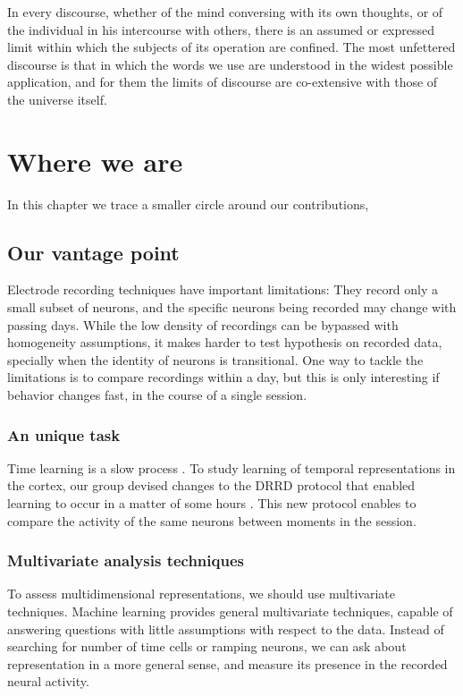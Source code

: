 \begin{savequote}[75mm]
In every discourse, whether of the mind conversing with its own thoughts, or of the individual in his intercourse with others, there is an assumed or expressed limit within which the subjects of its operation are confined. The most unfettered discourse is that in which the words we use are understood in the widest possible application, and for them the limits of discourse are co-extensive with those of the universe itself.
\end{savequote}

\chapter{Where we are}
\label{chap:where}

In this chapter we trace a smaller circle around our contributions, 


\section{Our vantage point}
Electrode recording techniques have important limitations: They record only a small subset of neurons, and the specific neurons being recorded may change with passing days. While the low density of recordings can be bypassed with homogeneity assumptions, it makes harder to test hypothesis on recorded data, specially when the identity of neurons is transitional. One way to tackle the limitations is to compare recordings within a day, but this is only interesting if behavior changes fast, in the course of a single session.
    \subsection{An unique task}
    Time learning is a slow process \cite{paton2018neural}. To study learning of temporal representations in the cortex, our group devised changes to the DRRD protocol that enabled learning to occur in a matter of some hours \cite{}. This new protocol enables to compare the activity of the same neurons between moments in the session. 
    
    \subsection{Multivariate analysis techniques}
    To assess multidimensional representations, we should use multivariate techniques. Machine learning provides general multivariate techniques, capable of answering questions with little assumptions with respect to the data. Instead of searching for number of time cells or ramping neurons, we can ask about representation in a more general sense, and measure its presence in the recorded neural activity. 


